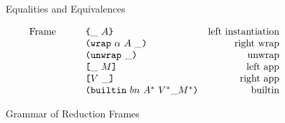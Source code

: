 \documentclass[../plutus-core-specification.tex]{subfiles}
\begin{document}
\begin{figure*}[t]
	\vspace{2em}
	
	\vspace{2em}
	
	
	
	\begin{prooftree}
	\end{prooftree}
	
	
	
	\caption{Equalities and Equivalences}
	\label{fig:Plutus_core_equalities_and_equivalences}
\end{figure*}





\begin{figure*}[t]
    \centering
    \[\begin{array}{lrclr}
        \textrm{Frame} &   &     & \inInstLeftFrame{A}                     & \textrm{left instantiation}\\
                       &   &     & \inWrapRightFrame{\alpha}{A}            & \textrm{right wrap}\\
                       &   &     & \inUnwrapFrame{}                        & \textrm{unwrap}\\
                       &   &     & \inAppLeftFrame{M}                      & \textrm{left app}\\
                       &   &     & \inAppRightFrame{V}                     & \textrm{right app}\\
                       &   &     & \inBuiltin{bn}{A^*}{V^*}{\_}{M^*}        & \textrm{builtin}\\
    \end{array}\]
    \caption{Grammar of Reduction Frames}
    \label{fig:Plutus_core_reduction_frames}
\end{figure*}
\end{document}
